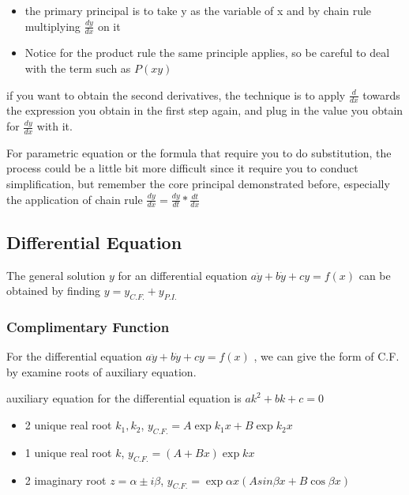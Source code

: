\documentclass[]{article}
\begin{document}
\begin{itemize}
\item
  the primary principal is to take y as the variable of x and by chain
  rule multiplying \(\frac{dy}{dx}\) on it
\item
  Notice for the product rule the same principle applies, so be careful
  to deal with the term such as \(P(xy)\)
\end{itemize}

if you want to obtain the second derivatives, the technique is to apply
\(\frac{d}{dx}\) towards the expression you obtain in the first step
again, and plug in the value you obtain for \(\frac{dy}{dx}\) with it.

For parametric equation or the formula that require you to do
substitution, the process could be a little bit more difficult since it
require you to conduct simplification, but remember the core principal
demonstrated before, especially the application of chain rule
\(\frac{dy}{dx} = \frac{dy}{dt} * \frac{dt}{dx}\)

\subsection{Differential Equation }\label{header-n48}

The general solution \(y\) for an differential equation
\(a\ddot{y} + b\dot{y} + cy = f(x)\) can be obtained by finding
\(y = y_{C.F.} + y_{P.I.}\)

\subsubsection{Complimentary Function}\label{header-n50}

For the differential equation \(a\ddot{y} + b\dot{y} + cy = f(x)\) , we
can give the form of C.F. by examine roots of auxiliary equation.

auxiliary equation for the differential equation is
\(ak^2 + bk + c = 0\)

\begin{itemize}
\item
  2 unique real root \(k_1,k_2\), \(y_{C.F.} = A\exp{k_1x}+B\exp{k_2x}\)
\item
  1 unique real root \(k\), \(y_{C.F.} = (A+Bx)\exp{kx}\)
\item
  2 imaginary root \(z = \alpha \pm i\beta \),
  \(y_{C.F.} = \exp{\alpha x}(Asin\beta x + B\cos\beta x)\)
\end{itemize}
\end{document}
